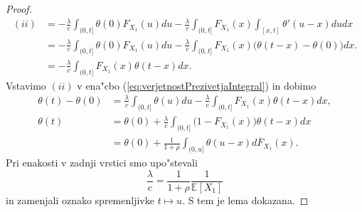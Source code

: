 \documentclass[12pt, a4paper, reqno]{amsart}
\theoremstyle{definition}
\theoremstyle{plain}
\newcommand{\E}{\mathbb{E}}
\newcommand{\1}{\mathds{1}}
\begin{document}
\begin{proof}
        \begin{align*}
            (ii)    &=  - \frac{\lambda}{c}\int_{(0, t]}\theta(0)F_{X_1}(u)du - \frac{\lambda}{c}\int_{(0, t]}F_{X_1}(x)\int_{[x, t]}\theta'(u - x)dudx \\
                    &= - \frac{\lambda}{c}\int_{(0, t]}\theta(0)F_{X_1}(u)du - \frac{\lambda}{c}\int_{(0, t]}F_{X_1}(x)\bigl(\theta(t-x) - \theta(0)\bigr)dx.\\
                    &= - \frac{\lambda}{c}\int_{(0, t]}F_{X_1}(x)\theta(t - x)dx.
        \end{align*}
        Vstavimo $(ii)$ v ena"cbo (\ref{eq:verjetnostPrezivetjaIntegral}) in dobimo
        \begin{align*}
            \theta(t) - \theta(0) &= \frac{\lambda}{c}\int_{(0, t]}\theta(u)du - \frac{\lambda}{c}\int_{(0, t]}F_{X_1}(x)\theta(t - x)dx,\\
            \theta(t) &= \theta(0) + \frac{\lambda}{c}\int_{(0, t]}\bigl(1 - F_{X_1}(x)\bigr)\theta(t - x)dx \\
                    &= \theta(0) + \frac{1}{1 + \rho}\int_{(0, u]}\theta(u - x)d\overline{F}_{X_1}(x).
        \end{align*}
        Pri enakosti v zadnji vrstici smo upo"stevali  
        \begin{equation*}
            \frac{\lambda}{c} = \frac{1}{1 + \rho}\frac{1}{\E\left[X_1\right]}
        \end{equation*}
        in zamenjali oznako spremenljivke $t\mapsto u$. S tem je lema dokazana. 

    \end{proof}
\end{document}
